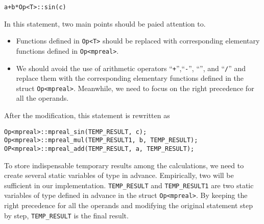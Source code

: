 \begin{itemize}
	\begin{center}
		{\tt a+b*Op<T>::sin(c)} 
	\end{center}
	In this statement, two main points should be paied attention to.
	\begin{itemize}
		\item Functions defined in \texttt{Op<T>} should be replaced with corresponding elementary functions defined in \texttt{Op<mpreal>}.
		\item We should avoid the use of arithmetic operators ``{\tt +}'',``{\tt -}'', ``{\tt *}'', and ``{\tt /}'' and replace them with the corresponding elementary functions defined in the struct {\tt Op<mpreal>}. Meanwhile, we need to focus on the right precedence for all the operands.\\
	\end{itemize}
	After the modification, this statement is rewritten as
\begin{lstlisting}[numbers=none]
Op<mpreal>::mpreal_sin(TEMP_RESULT, c);
Op<mpreal>::mpreal_mul(TEMP_RESULT1, b, TEMP_RESULT);
OP<mpreal>::mpreal_add(TEMP_RESULT, a, TEMP_RESULT);
\end{lstlisting}
	To store indispensable temporary results among the calculations, we need to create several static variables of type \mpreal in advance. Empirically, two will be sufficient in our implementation. {\tt TEMP\_RESULT} and {\tt TEMP\_RESULT1} are two static variables of type \mpreal defined in advance in the struct {\tt Op<mpreal>}. By keeping the right precedence for all the operands and modifying the original statement step by step, {\tt TEMP\_RESULT} is the final result.
\end{itemize}
